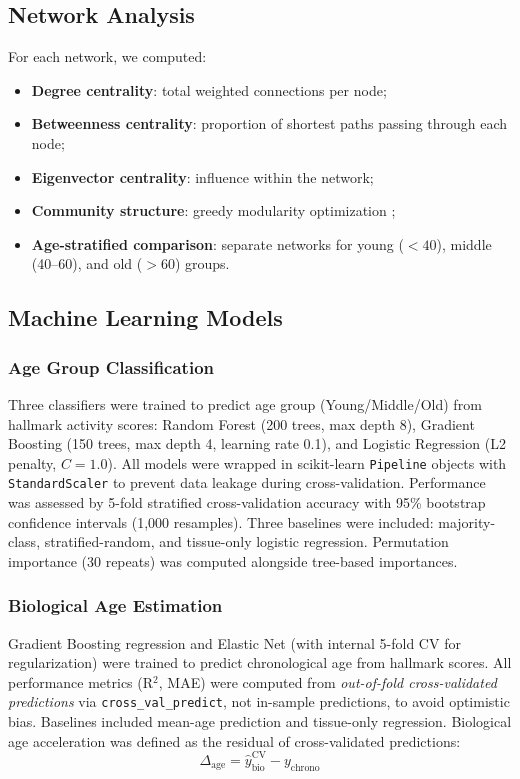 \documentclass[11pt,a4paper]{article}
\begin{document}
\subsection{Network Analysis}

For each network, we computed:
\begin{itemize}[noitemsep]
    \item \textbf{Degree centrality}: total weighted connections per node;
    \item \textbf{Betweenness centrality}: proportion of shortest paths passing through each node;
    \item \textbf{Eigenvector centrality}: influence within the network;
    \item \textbf{Community structure}: greedy modularity optimization \citep{clauset2004finding};
    \item \textbf{Age-stratified comparison}: separate networks for young ($<40$), middle (40--60), and old ($>60$) groups.
\end{itemize}

\subsection{Machine Learning Models}

\subsubsection{Age Group Classification}
Three classifiers were trained to predict age group (Young/Middle/Old) from hallmark activity scores: Random Forest (200 trees, max depth 8), Gradient Boosting (150 trees, max depth 4, learning rate 0.1), and Logistic Regression (L2 penalty, $C=1.0$). All models were wrapped in scikit-learn \texttt{Pipeline} objects with \texttt{StandardScaler} to prevent data leakage during cross-validation. Performance was assessed by 5-fold stratified cross-validation accuracy with 95\% bootstrap confidence intervals (1,000 resamples). Three baselines were included: majority-class, stratified-random, and tissue-only logistic regression. Permutation importance (30 repeats) was computed alongside tree-based importances.

\subsubsection{Biological Age Estimation}
Gradient Boosting regression and Elastic Net (with internal 5-fold CV for regularization) were trained to predict chronological age from hallmark scores. All performance metrics (R$^2$, MAE) were computed from \textit{out-of-fold cross-validated predictions} via \texttt{cross\_val\_predict}, not in-sample predictions, to avoid optimistic bias. Baselines included mean-age prediction and tissue-only regression. Biological age acceleration was defined as the residual of cross-validated predictions:
\begin{equation}
    \Delta_{\text{age}} = \hat{y}_{\text{bio}}^{\text{CV}} - y_{\text{chrono}}
\end{equation}
\end{document}
